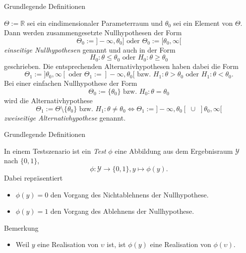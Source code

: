 \documentclass[
  8pt,
  ignorenonframetext,
]{beamer}
\providecommand{\tightlist}{%
  \setlength{\itemsep}{0pt}\setlength{\parskip}{0pt}}
\newcommand{\ups} {\upsilon}
\begin{document}
\begin{frame}{Grundlegende Definitionen}
\protect\hypertarget{grundlegende-definitionen-2}{}
\small
{}

\begin{definition}
\justifying
$\Theta := \mathbb{R}$ sei ein eindimensionaler Parameterraum und $\theta_0$
sei ein Element von $\Theta$. Dann werden zusammengesetzte Nullhypothesen der
Form
\begin{equation}
\Theta_0 := ]-\infty,\theta_0] \mbox{ oder }
\Theta_0 := [\theta_0,\infty[
\end{equation}
\textit{einseitige Nullhypothesen} genannt und auch in der Form
\begin{equation}
H_0 : \theta \le \theta_0 \mbox{ oder } H_0 : \theta \ge \theta_0
\end{equation}
geschrieben. Die entsprechenden Alternativhypothesen haben dabei die Form
\begin{equation}
\Theta_1 := ]\theta_0,\infty[ \mbox{ oder } \Theta_1 := ]-\infty, \theta_0[
\mbox{ bzw. }  H_1 : \theta > \theta_0 \mbox{ oder } H_1 : \theta < \theta_0.
\end{equation}
Bei einer einfachen Nullhypothese der Form
\begin{equation}
\Theta_0 := \{\theta_0\} \mbox{ bzw. } H_0 : \theta = \theta_0
\end{equation}
wird die Alternativhypothese
\begin{equation}
\Theta_1 := \Theta \setminus \{\theta_0\} \mbox{ bzw. } H_1 : \theta \neq \theta_0
\Leftrightarrow \Theta_1 := ]-\infty, \theta_0[\,\, \cup \,\,]\theta_0,\infty[
\end{equation}
\textit{zweiseitige Alternativhypothese} genannt.
\end{definition}
\end{frame}

\begin{frame}{Grundlegende Definitionen}
\protect\hypertarget{grundlegende-definitionen-3}{}
\small
\begin{definition}[Test]
\justifying
In einem Testszenario ist ein \textit{Test} $\phi$ eine Abbildung aus dem
Ergebnisraum $\mathcal{Y}$ nach $\{0,1\}$,
\begin{equation}
\phi : \mathcal{Y} \to \{0,1\}, y \mapsto \phi(y).
\end{equation}
Dabei repräsentiert
\begin{itemize}
\item $\phi(y) = 0$ den Vorgang des Nichtablehnens der Nullhypothese.
\item $\phi(y) = 1$ den Vorgang des Ablehnens der Nullhypothese.
\end{itemize}
\end{definition}

\footnotesize

Bemerkung

\begin{itemize}
\tightlist
\item
  Weil \(y\) eine Realisation von \(\ups\) ist, ist \(\phi(y)\) eine
  Realisation von \(\phi(\ups)\).
\end{itemize}
\end{frame}
\end{document}
